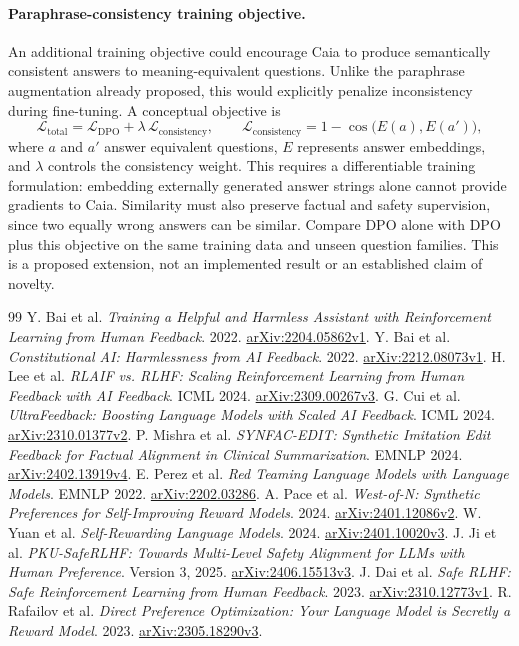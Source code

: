 \documentclass[11pt]{article}
\begin{document}
\paragraph{Paraphrase-consistency training objective.}
An additional training objective could encourage Caia to produce semantically consistent answers to meaning-equivalent questions. Unlike the paraphrase augmentation already proposed, this would explicitly penalize inconsistency during fine-tuning. A conceptual objective is
\[
\mathcal{L}_{\mathrm{total}} = \mathcal{L}_{\mathrm{DPO}}
+ \lambda\,\mathcal{L}_{\mathrm{consistency}},
\qquad
\mathcal{L}_{\mathrm{consistency}} = 1-\cos\bigl(E(a),E(a')\bigr),
\]
where $a$ and $a'$ answer equivalent questions, $E$ represents answer embeddings, and $\lambda$ controls the consistency weight. This requires a differentiable training formulation: embedding externally generated answer strings alone cannot provide gradients to Caia. Similarity must also preserve factual and safety supervision, since two equally wrong answers can be similar. Compare DPO alone with DPO plus this objective on the same training data and unseen question families. This is a proposed extension, not an implemented result or an established claim of novelty.

\begin{thebibliography}{99}
 Y. Bai et al. \emph{Training a Helpful and Harmless Assistant with Reinforcement Learning from Human Feedback}. 2022. \href{https://arxiv.org/abs/2204.05862v1}{arXiv:2204.05862v1}.
 Y. Bai et al. \emph{Constitutional AI: Harmlessness from AI Feedback}. 2022. \href{https://arxiv.org/abs/2212.08073v1}{arXiv:2212.08073v1}.
 H. Lee et al. \emph{RLAIF vs. RLHF: Scaling Reinforcement Learning from Human Feedback with AI Feedback}. ICML 2024. \href{https://arxiv.org/abs/2309.00267v3}{arXiv:2309.00267v3}.
 G. Cui et al. \emph{UltraFeedback: Boosting Language Models with Scaled AI Feedback}. ICML 2024. \href{https://arxiv.org/abs/2310.01377v2}{arXiv:2310.01377v2}.
 P. Mishra et al. \emph{SYNFAC-EDIT: Synthetic Imitation Edit Feedback for Factual Alignment in Clinical Summarization}. EMNLP 2024. \href{https://arxiv.org/abs/2402.13919v4}{arXiv:2402.13919v4}.
 E. Perez et al. \emph{Red Teaming Language Models with Language Models}. EMNLP 2022. \href{https://arxiv.org/abs/2202.03286}{arXiv:2202.03286}.
 A. Pace et al. \emph{West-of-N: Synthetic Preferences for Self-Improving Reward Models}. 2024. \href{https://arxiv.org/abs/2401.12086v2}{arXiv:2401.12086v2}.
 W. Yuan et al. \emph{Self-Rewarding Language Models}. 2024. \href{https://arxiv.org/abs/2401.10020v3}{arXiv:2401.10020v3}.
 J. Ji et al. \emph{PKU-SafeRLHF: Towards Multi-Level Safety Alignment for LLMs with Human Preference}. Version 3, 2025. \href{https://arxiv.org/abs/2406.15513v3}{arXiv:2406.15513v3}.
 J. Dai et al. \emph{Safe RLHF: Safe Reinforcement Learning from Human Feedback}. 2023. \href{https://arxiv.org/abs/2310.12773v1}{arXiv:2310.12773v1}.
 R. Rafailov et al. \emph{Direct Preference Optimization: Your Language Model is Secretly a Reward Model}. 2023. \href{https://arxiv.org/abs/2305.18290v3}{arXiv:2305.18290v3}.
\end{thebibliography}
\end{document}
